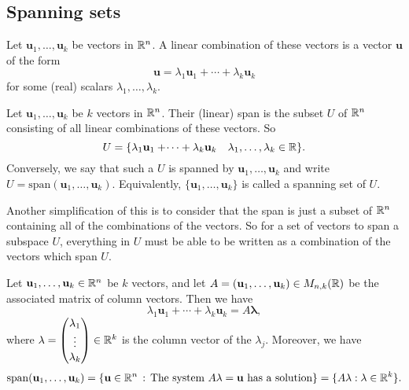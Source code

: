 \documentclass[10pt, a4paper]{article}
\newcommand{\mbf}[1]{\mathbf{#1}}
\begin{document}
\subsection{Spanning sets}
Let $\mbf{u}_1, \dotsc, \mbf{u}_k$ be vectors in $\mathbb{R} ^ n$.
A linear combination of these vectors is a vector $\mbf{u}$ of the form
\[
\mbf{u} = \lambda_1\mbf{u}_1 + \dotsi + \lambda_k\mbf{u}_k
\]
for some (real) scalars $\lambda_1, \dotsc, \lambda_k$.

\begin{definition}
    Let $\mbf{u}_1, \dotsc, \mbf{u}_k$ be $k$ vectors in $\mathbb{R} ^ n$.
    Their (linear) span is the subset $U$ of $\mathbb{R} ^ n$ consisting of all linear combinations of these vectors.
    So
    \[
    U = \{\lambda_1\mbf{u}_1 + \dotsi + \lambda_k\mbf{u}_k\quad\lambda_1, \dotsc, \lambda_k \in \R\}.
    \]
    Conversely,
    we say that such a $U$ is spanned by $\mbf{u}_1, \dotsc, \mbf{u}_k$ and write $U = \mathrm{span}(\mbf{u}_1, \dotsc, \mbf{u}_k)$.
    Equivalently,
    $\{\mbf{u}_1, \dotsc, \mbf{u}_k\}$ is called a spanning set of $U$.
\end{definition}
Another simplification of this is to consider that the span is just a subset of $\mathbb{R} ^ n$ containing all of the combinations of the vectors.
So for a set of vectors to span a subspace $U$,
everything in $U$ must be able to be written as a combination of the vectors which span $U$.

\begin{proposition}
    Let $\mbf{u}_1, \dotsc, \mbf{u}_k \in \R ^ n$ be $k$ vectors,
    and let $A = (\mbf{u}_1, \dotsc, \mbf{u}_k) \in M_{n, k}(\R)$ be the associated matrix of column vectors.
    Then we have
    \[
    \lambda_1\mbf{u}_1 + \dotsi + \lambda_k\mbf{u}_k = A\mbf{\lambda},
    \]
    where $\mbf{\lambda} = \begin{pmatrix}
        \lambda_1 \\ \vdots \\ \lambda_k
    \end{pmatrix} \in \R ^ k$ is the column vector of the $\lambda_j$.
    Moreover,
    we have
    \[
    \mathrm{span}(\mbf{u}_1, \dotsc, \mbf{u}_k) = \{\mbf{u} \in \R ^ n\,:\,\text{The system } A\mbf{\lambda} = \mbf{u}\text{ has a solution}\} = \{A\mbf{\lambda}:\mbf{\lambda} \in \R ^ k\}.
    \]
\end{proposition}
\end{document}
